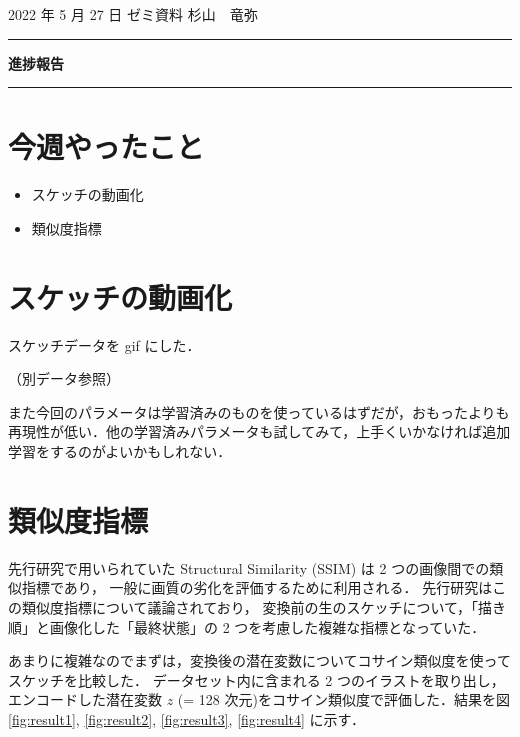 \documentclass[onecolumn]{ujarticle}   %
\begin{document}

		\noindent
		\hspace{1em}
		2022 年 5 月 27 日
		ゼミ資料
		\hfill
		杉山　竜弥
		\vspace{2mm}

		\hrule
		\begin{center}
			{\Large \bf 進捗報告}
		\end{center}
		\hrule
		\vspace{9mm}


\section{今週やったこと}
\begin{itemize}
  \item スケッチの動画化
  \item 類似度指標
\end{itemize}

\section{スケッチの動画化}
スケッチデータを gif にした．

（別データ参照）

また今回のパラメータは学習済みのものを使っているはずだが，おもったよりも再現性が低い．他の学習済みパラメータも試してみて，上手くいかなければ追加学習をするのがよいかもしれない．

\section{類似度指標}
先行研究で用いられていた Structural Similarity (SSIM) は 2 つの画像間での類似指標であり，
一般に画質の劣化を評価するために利用される．
先行研究はこの類似度指標について議論されており，
変換前の生のスケッチについて，「描き順」と画像化した「最終状態」の 2 つを考慮した複雑な指標となっていた．

あまりに複雑なのでまずは，変換後の潜在変数についてコサイン類似度を使ってスケッチを比較した．
データセット内に含まれる 2 つのイラストを取り出し，エンコードした潜在変数 $z$ (= 128 次元)をコサイン類似度で評価した．結果を図 \ref{fig:result1}, \ref{fig:result2}, \ref{fig:result3}, \ref{fig:result4} に示す．
\end{document}
